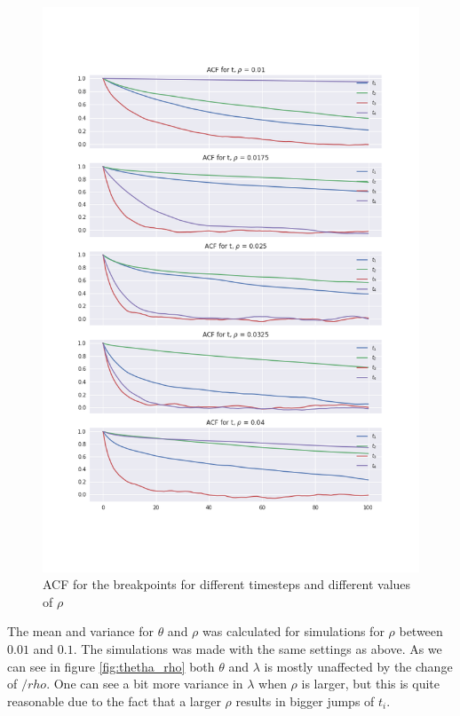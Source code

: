 \documentclass[a4paper]{article}
\begin{document}
\begin{figure}[H]
    \centering
    \includegraphics[width = 1.0\textwidth]{images/ACF.png} 
    \caption{ACF for the breakpoints for different timesteps and different values of $\rho$}
    \label{fig:acf}
\end{figure}

The mean and variance for $\theta$ and $\rho$ was calculated for simulations for $\rho$ between $0.01$ and $0.1$. The simulations was made with the same settings as above. As we can see in figure \ref{fig:thetha_rho} both $\theta$ and $\lambda$ is mostly unaffected by the change of $/rho$. One can see a bit more variance in $\lambda$ when $\rho$ is larger, but this is quite reasonable due to the fact that a larger $\rho$ results in bigger jumps of $t_i$.
\end{document}
